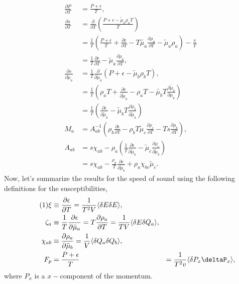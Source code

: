 \documentclass[12pt]{article}
\numberwithin{equation}{section}
\numberwithin{figure}{section}
\newcommand\eqnumber{\addtocounter{equation}{1}\tag{\theequation}}
\begin{document}
\begin{align*}
\frac{\partial P}{\partial T}&=\frac{P+\epsilon}{T},\\
\frac{\partial s}{\partial T}&=\frac{\partial}{\partial T}\left(\frac{P+\epsilon-\tilde\mu_a\rho_aT}{T}\right)\\
&=\frac{1}{T}\left(\frac{P+\epsilon}{T}+\frac{\partial\epsilon}{\partial T}-T\tilde{\mu_a}\frac{\partial\rho_a}{\partial T}-\tilde{\mu}_a\rho_a\right)-\frac{s}{T}\\
&=\frac{1}{T}\frac{\partial\epsilon}{\partial T}-\tilde{\mu}_a\frac{\partial\rho_a}{\partial T},\\
\frac{\partial s}{\partial\tilde{\mu}_a}&=\frac{1}{T}\frac{\partial}{\partial\tilde{\mu}_a}(P+\epsilon-\tilde{\mu}_b\rho_bT),\\
&=\frac{1}{T}\left(
\rho_aT+\frac{\partial\epsilon}{\partial\tilde{\mu}_a}-\rho_aT-\tilde{\mu_b}T\frac{\partial\tilde{\mu}_b}{\partial\mu_a}
\right)\\
&=\frac{1}{T}\left(
\frac{\partial\epsilon}{\partial\tilde{\mu}_a}-\tilde{\mu}_bT\frac{\partial\rho_b}{\partial\tilde{\mu}_a}
\right)\\
M_a&=A^{-1}_{ab}\left(
\rho_b \frac{\partial\epsilon}{\partial T}  -\rho_bT\tilde{\mu}_c\frac{\partial\rho_c}{\partial T}-Ts\frac{\partial\rho_b}{\partial T}\right),\\
A_{ab}&=s\chi_{ab}-\rho_a\left(
\frac{1}{T}\frac{\partial\epsilon}{\partial\tilde{\mu}_b}-\tilde{\mu}_c\frac{\partial\rho_c}{\partial\tilde{\mu}_b}
\right)\\
&=s\chi_{ab}-\frac{\rho_a}{T}\frac{\partial\epsilon}{\partial\tilde{\mu}_b}+\rho_a\chi_{bc}\tilde{\mu}_c.
\end{align*}
Now, let's summarize the results for the speed of sound using the following definitions for the susceptibilities,
\begin{align*}\eqnumber
\xi&\equiv \frac{\partial\epsilon}{\partial T}=\frac{1}{T^2V}\langle\delta E\delta E\rangle,\\
\zeta_a&\equiv\frac{1}{T}\frac{\partial\epsilon}{\partial\tilde{\mu}_a}=T\frac{\partial\rho_a}{\partial T}
=\frac{1}{TV}\langle\delta E\delta Q_a\rangle,\\
\chi_{ab}&\equiv\frac{\partial\rho_a}{\partial\tilde{\mu}_b}=\frac{1}{V}\langle\delta Q_a\delta Q_b\rangle,\\
F_p&=\frac{P+\epsilon}{T}&=\frac{1}{T^2v}\langle\delta P_x\deltaP_x\rangle,
\end{align*}
where $P_x$ is a $x-$component of the momentum.
\end{document}
